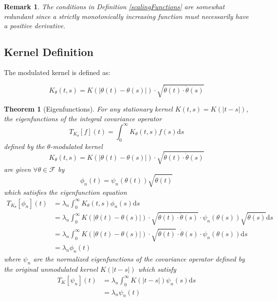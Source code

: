 \documentclass{article}
\newtheorem{theorem}{Theorem}
\newtheorem{remark}{Remark}
\newcommand{\dd}{\mathrm{d}}
\newcommand{\Fcal}{\mathcal{F}}
\newcommand{\dottheta}{\dot{\theta}}
\begin{document}
\begin{remark}
The conditions in Definition \ref{scalingFunctions} are somewhat redundant since a strictly monotonically increasing function must necessarily have a positive derivative.
\end{remark}

\subsection{Kernel Definition}

The modulated kernel is defined as:

\begin{equation}
K_\theta(t,s) = K(|\theta(t)-\theta(s)|) \cdot \sqrt{\dottheta(t) \cdot \dottheta(s)}
\end{equation}

\begin{theorem}[Eigenfunctions]
For any stationary kernel $K(t,s)=K(|t-s|)$, the eigenfunctions of the integral covariance operator
\begin{equation}
T_{K_\theta}[f](t) = \int_0^\infty K_\theta(t,s)f(s)\dd s
\end{equation}
defined by the $\theta$-modulated kernel
\begin{equation}
K_\theta(t,s) = K(|\theta(t)-\theta(s)|) \cdot \sqrt{\dottheta(t) \cdot \dottheta(s)}
\end{equation}
are given $\forall \theta\in\Fcal$ by
\begin{equation}
\phi_n(t) = \psi_n(\theta(t))\sqrt{\dottheta(t)}
\end{equation}
which satisfies the eigenfunction equation
\begin{align}
T_{K_\theta}[\phi_n](t) &= \lambda_n \int_0^\infty K_\theta(t,s) \phi_n(s) \dd s\\
&= \lambda_n \int_0^\infty K(|\theta(t)-\theta(s)|) \cdot \sqrt{\dottheta(t) \cdot \dottheta(s)} \cdot \psi_n(\theta(s))\sqrt{\dottheta(s)} \dd s\\
&= \lambda_n \int_0^\infty K(|\theta(t)-\theta(s)|) \cdot \sqrt{\dottheta(t)} \cdot \dottheta(s) \cdot \psi_n(\theta(s)) \dd s\\
&= \lambda_n \phi_n(t)
\end{align}
where $\psi_n$ are the normalized eigenfunctions of the covariance operator defined by the original unmodulated kernel $K(|t-s|)$ which satisfy
\begin{align}
T_K[\psi_n](t) &= \lambda_n \int_0^\infty K(|t-s|)\psi_n(s) \dd s\\
&= \lambda_n \psi_n(t)
\end{align}
\end{theorem}
\end{document}
